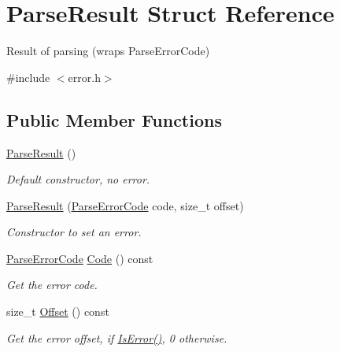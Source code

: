 \hypertarget{a02188}{}\section{Parse\+Result Struct Reference}
\label{a02188}


Result of parsing (wraps Parse\+Error\+Code)  




{\ttfamily \#include $<$error.\+h$>$}

\subsection*{Public Member Functions}
\begin{DoxyCompactItemize}
\item 
\mbox{\label{a02188_acd4a266f815bec59fa27f64f1923fe9e}} 
\hyperlink{a02188_acd4a266f815bec59fa27f64f1923fe9e}{Parse\+Result} ()
\begin{DoxyCompactList}\small\item\em Default constructor, no error. \end{DoxyCompactList}\item 
\mbox{\label{a02188_a38ca49a53e80633d0864ad5026adaf84}} 
\hyperlink{a02188_a38ca49a53e80633d0864ad5026adaf84}{Parse\+Result} (\hyperlink{a00635_ga8d4b32dfc45840bca189ade2bbcb6ba7}{Parse\+Error\+Code} code, size\+\_\+t offset)
\begin{DoxyCompactList}\small\item\em Constructor to set an error. \end{DoxyCompactList}\item 
\mbox{\label{a02188_a2aae3c2f42b31cc2409ee1e03bc4852e}} 
\hyperlink{a00635_ga8d4b32dfc45840bca189ade2bbcb6ba7}{Parse\+Error\+Code} \hyperlink{a02188_a2aae3c2f42b31cc2409ee1e03bc4852e}{Code} () const
\begin{DoxyCompactList}\small\item\em Get the error code. \end{DoxyCompactList}\item 
\mbox{\label{a02188_afbe762766ac21b2aae266105f1dfa643}} 
size\+\_\+t \hyperlink{a02188_afbe762766ac21b2aae266105f1dfa643}{Offset} () const
\begin{DoxyCompactList}\small\item\em Get the error offset, if \hyperlink{a02188_adfe0ef5b994e82f8aa9ebf0b30c924b1}{Is\+Error()}, 0 otherwise. \end{DoxyCompactList}\item 

\end{DoxyCompactItemize}

